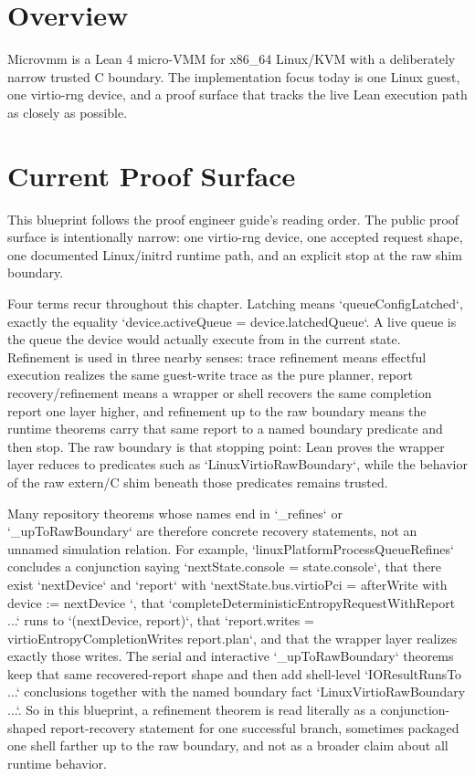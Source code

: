 \chapter{Overview}

Microvmm is a Lean 4 micro-VMM for x86\_64 Linux/KVM with a deliberately narrow trusted C boundary.
The implementation focus today is one Linux guest, one virtio-rng device, and a proof surface that tracks the live Lean execution path as closely as possible.

\chapter{Current Proof Surface}

This blueprint follows the proof engineer guide's reading order.
The public proof surface is intentionally narrow: one virtio-rng device, one accepted request shape, one documented Linux/initrd runtime path, and an explicit stop at the raw shim boundary.

Four terms recur throughout this chapter. Latching means `queueConfigLatched`, exactly the equality `device.activeQueue = device.latchedQueue`. A live queue is the queue the device would actually execute from in the current state. Refinement is used in three nearby senses: trace refinement means effectful execution realizes the same guest-write trace as the pure planner, report recovery/refinement means a wrapper or shell recovers the same completion report one layer higher, and refinement up to the raw boundary means the runtime theorems carry that same report to a named boundary predicate and then stop. The raw boundary is that stopping point: Lean proves the wrapper layer reduces to predicates such as `LinuxVirtioRawBoundary`, while the behavior of the raw extern/C shim beneath those predicates remains trusted.

Many repository theorems whose names end in `_refines` or `_upToRawBoundary` are therefore concrete recovery statements, not an unnamed simulation relation. For example, `linuxPlatformProcessQueueRefines` concludes a conjunction saying `nextState.console = state.console`, that there exist `nextDevice` and `report` with `nextState.bus.virtioPci = { afterWrite with device := nextDevice }`, that `completeDeterministicEntropyRequestWithReport ...` runs to `(nextDevice, report)`, that `report.writes = virtioEntropyCompletionWrites report.plan`, and that the wrapper layer realizes exactly those writes. The serial and interactive `_upToRawBoundary` theorems keep that same recovered-report shape and then add shell-level `IOResultRunsTo ...` conclusions together with the named boundary fact `LinuxVirtioRawBoundary ...`. So in this blueprint, a refinement theorem is read literally as a conjunction-shaped report-recovery statement for one successful branch, sometimes packaged one shell farther up to the raw boundary, and not as a broader claim about all runtime behavior.

